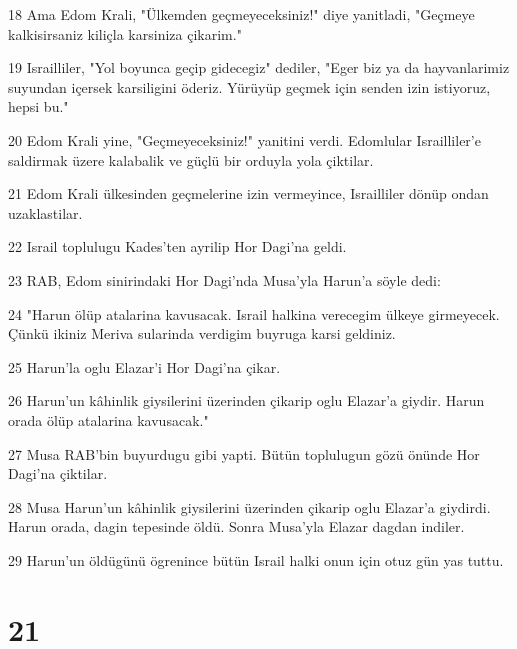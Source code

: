 \par 18 Ama Edom Krali, "Ülkemden geçmeyeceksiniz!" diye yanitladi, "Geçmeye kalkisirsaniz kiliçla karsiniza çikarim."
\par 19 Israilliler, "Yol boyunca geçip gidecegiz" dediler, "Eger biz ya da hayvanlarimiz suyundan içersek karsiligini öderiz. Yürüyüp geçmek için senden izin istiyoruz, hepsi bu."
\par 20 Edom Krali yine, "Geçmeyeceksiniz!" yanitini verdi. Edomlular Israilliler'e saldirmak üzere kalabalik ve güçlü bir orduyla yola çiktilar.
\par 21 Edom Krali ülkesinden geçmelerine izin vermeyince, Israilliler dönüp ondan uzaklastilar.
\par 22 Israil toplulugu Kades'ten ayrilip Hor Dagi'na geldi.
\par 23 RAB, Edom sinirindaki Hor Dagi'nda Musa'yla Harun'a söyle dedi:
\par 24 "Harun ölüp atalarina kavusacak. Israil halkina verecegim ülkeye girmeyecek. Çünkü ikiniz Meriva sularinda verdigim buyruga karsi geldiniz.
\par 25 Harun'la oglu Elazar'i Hor Dagi'na çikar.
\par 26 Harun'un kâhinlik giysilerini üzerinden çikarip oglu Elazar'a giydir. Harun orada ölüp atalarina kavusacak."
\par 27 Musa RAB'bin buyurdugu gibi yapti. Bütün toplulugun gözü önünde Hor Dagi'na çiktilar.
\par 28 Musa Harun'un kâhinlik giysilerini üzerinden çikarip oglu Elazar'a giydirdi. Harun orada, dagin tepesinde öldü. Sonra Musa'yla Elazar dagdan indiler.
\par 29 Harun'un öldügünü ögrenince bütün Israil halki onun için otuz gün yas tuttu.

\chapter{21}

